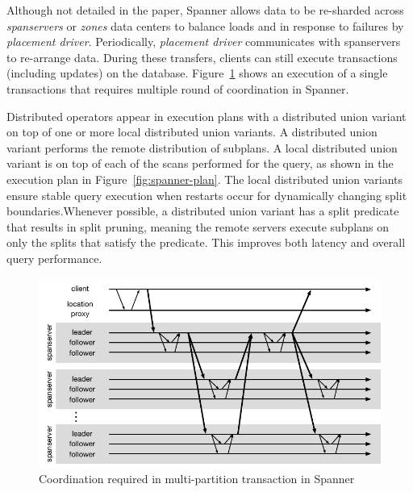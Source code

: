 Although not detailed in the paper, Spanner allows data to be re-sharded across
\emph{spanservers} or \emph{zones} data centers to balance loads and in response
to failures by \emph{placement driver}. Periodically, \emph{placement driver}
communicates with spanservers to re-arrange data. During these transfers,
clients can still execute transactions (including updates) on the database.
Figure~\ref{fig:spanner} shows an execution of a single transactions that
requires multiple round of coordination in Spanner.

Distributed operators appear in execution plans with a distributed union variant
on top of one or more local distributed union variants. A distributed union
variant performs the remote distribution of subplans. A local distributed union
variant is on top of each of the scans performed for the query, as shown in the
execution plan in Figure~\ref{fig:spanner-plan}. The local distributed union
variants ensure stable query execution when restarts occur for dynamically
changing split boundaries.Whenever possible, a distributed union variant has a
split predicate that results in split pruning, meaning the remote servers
execute subplans on only the splits that satisfy the predicate. This improves
both latency and overall query performance.


\begin{figure}
  \begin{minipage}[b]{1.0\linewidth}
  \centering
        \includegraphics[width=0.6\linewidth]{figures/spanner-execution}
  \end{minipage}
  \caption{Coordination required in multi-partition transaction in Spanner}
  \label{fig:spanner}
\end{figure}

